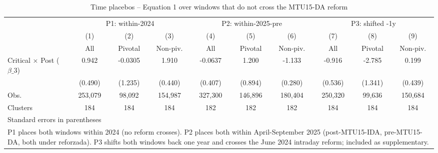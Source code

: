 \begin{table}[htbp]\centering
\caption{Time placebos -- Equation 1 over windows that do not cross the MTU15-DA reform}
\begin{tabular}{l*{9}{c}}
\toprule
                    &\multicolumn{3}{c}{P1: within-2024}   &\multicolumn{3}{c}{P2: within-2025-pre}&\multicolumn{3}{c}{P3: shifted -1y}   \\\cmidrule(lr){2-4}\cmidrule(lr){5-7}\cmidrule(lr){8-10}
                    &\multicolumn{1}{c}{(1)}&\multicolumn{1}{c}{(2)}&\multicolumn{1}{c}{(3)}&\multicolumn{1}{c}{(4)}&\multicolumn{1}{c}{(5)}&\multicolumn{1}{c}{(6)}&\multicolumn{1}{c}{(7)}&\multicolumn{1}{c}{(8)}&\multicolumn{1}{c}{(9)}\\
                    &\multicolumn{1}{c}{All}&\multicolumn{1}{c}{Pivotal}&\multicolumn{1}{c}{Non-piv.}&\multicolumn{1}{c}{All}&\multicolumn{1}{c}{Pivotal}&\multicolumn{1}{c}{Non-piv.}&\multicolumn{1}{c}{All}&\multicolumn{1}{c}{Pivotal}&\multicolumn{1}{c}{Non-piv.}\\
\midrule
Critical $\times$ Post ($\beta\_3$)&       0.942&     -0.0305&       1.910&     -0.0637&       1.200&      -1.133&      -0.916&      -2.785&       0.199\\
                    &     (0.490)&     (1.235)&     (0.440)&     (0.407)&     (0.894)&     (0.280)&     (0.536)&     (1.341)&     (0.439)\\
\midrule
Obs.                &     253,079&      98,092&     154,987&     327,300&     146,896&     180,404&     250,320&      99,636&     150,684\\
Clusters            &         184&         184&         184&         182&         182&         182&         184&         184&         184\\
\bottomrule
\multicolumn{10}{l}{\footnotesize Standard errors in parentheses}\\
\multicolumn{10}{l}{\footnotesize P1 places both windows within 2024 (no reform crosses). P2 places both within April-September 2025 (post-MTU15-IDA, pre-MTU15-DA, both under reforzada). P3 shifts both windows back one year and crosses the June 2024 intraday reform; included as supplementary.}\\
\end{tabular}
\end{table}
